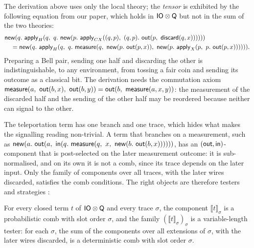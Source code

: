 The derivation above uses only the local theory; the \emph{tensor} is exhibited by the following equation from our paper, which holds in $\mathsf{IO}\otimes\mathsf{Q}$ but not in the sum of the two theories:
\begin{align*}
&\opnew(q.\ \applyU{H}(q,\ q.\ \opnew(p.\ \applyU{CX}((q,p),\ (q,p).\ \opout(p,\ \mathsf{discard}(q, x))))))\\
&\quad = \opnew(q.\ \applyU{H}(q,\ q.\ \opmeasure(q,\ \opnew(p.\ \opout(p, x)),\ \opnew(p.\ \applyU{X}(p,\ p.\ \opout(p, x)))))).
\end{align*}
Preparing a Bell pair, sending one half and discarding the other is indistinguishable, to any environment, from tossing a fair coin and sending its outcome as a classical bit. The derivation needs the commutation axiom $\mathsf{measure}(a,\ \mathsf{out}(b,x),\ \mathsf{out}(b,y)) = \mathsf{out}(b,\ \mathsf{measure}(a,x,y))$: the measurement of the discarded half and the sending of the other half may be reordered because neither can signal to the other.

The teleportation term has one branch and one trace, which hides what makes the signalling reading non-trivial. A term that branches on a measurement, such as $\opnew(a.\ \opout(a,\ \opin(q.\ \opmeasure(q,\ x,\ \opnew(b.\ \opout(b, x))))))$, has an $(\mathsf{out},\mathsf{in})$-component that is post-selected on the later measurement outcome: it is sub-normalised, and on its own it is not a comb, since its trace depends on the later input. Only the family of components over all traces, with the later wires discarded, satisfies the comb conditions. The right objects are therefore testers and strategies \cite{chiribella2009networks,gutoski2007games}:
\begin{conj}\label{conj:b1}
For every closed term $t$ of $\mathsf{IO}\otimes\mathsf{Q}$ and every trace $\sigma$, the component $\llbracket t\rrbracket_\sigma$ is a probabilistic comb with slot order $\sigma$, and the family $(\llbracket t\rrbracket_\sigma)_\sigma$ is a variable-length tester: for each $\sigma$, the sum of the components over all extensions of $\sigma$, with the later wires discarded, is a deterministic comb with slot order $\sigma$.
\end{conj}

